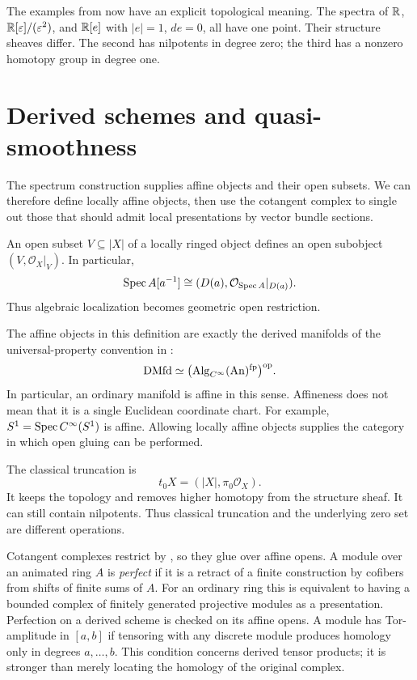 The examples from  now have an explicit topological meaning.
The spectra of $\mathbb{R}$, $\mathbb{R}[\varepsilon]/(\varepsilon^2)$, and
$\mathbb{R}[e]$ with $|e|=1$, $de=0$, all have one point.
Their structure sheaves differ. The second has nilpotents in degree zero;
the third has a nonzero homotopy group in degree one.

\section{Derived schemes and quasi-smoothness}

The spectrum construction supplies affine objects and their open subsets.
We can therefore define locally affine objects, then use the cotangent
complex to single out those that should admit local presentations by
vector bundle sections.

An open subset $V\subseteq|X|$ of a locally ringed object defines
an open subobject $(V,\mathcal O_X|_V)$. In particular,
\[
 \operatorname{Spec} A[a^{-1}]
 \cong(D(a),\mathcal O_{\operatorname{Spec} A}|_{D(a)}).
\]
Thus algebraic localization becomes geometric open restriction.


The affine objects in this definition are exactly the derived manifolds
of the universal-property convention in :
\[
 \mathrm{DMfd}\simeq
 \bigl(\operatorname{Alg}_{C^\infty}(\operatorname{An})^{\mathrm{fp}}\bigr)^{\mathrm{op}}.
\]
In particular, an ordinary manifold is affine in this sense.
Affineness does not mean that it is a single Euclidean coordinate chart.
For example, $S^1=\operatorname{Spec}C^\infty(S^1)$ is affine.
Allowing locally affine objects supplies the category in which
open gluing can be performed.

The classical truncation is
\[
 t_0X=(|X|,\pi_0\mathcal O_X).
\]
It keeps the topology and removes higher homotopy from the structure
sheaf. It can still contain nilpotents. Thus classical truncation and
the underlying zero set are different operations.

Cotangent complexes restrict by
, so they glue over affine opens.
A module over an animated ring $A$ is \emph{perfect} if it is a retract
of a finite construction by cofibers from shifts of finite sums of $A$.
For an ordinary ring this is equivalent to having a bounded complex
of finitely generated projective modules as a presentation. Perfection
on a derived scheme is checked on its affine opens. A module has Tor-amplitude
in $[a,b]$ if tensoring with any discrete module produces homology
only in degrees $a,\ldots,b$.
This condition concerns derived tensor products; it is stronger than
merely locating the homology of the original complex.

